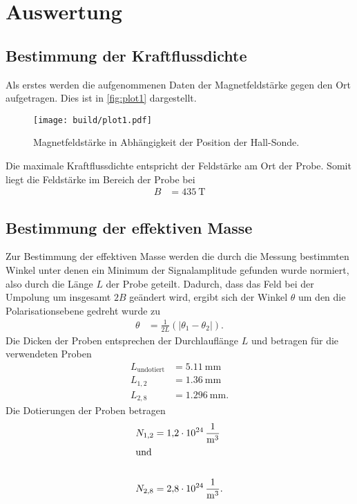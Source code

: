 \section{Auswertung}
\label{sec:Auswertung}


\subsection{Bestimmung der Kraftflussdichte}
\label{sub:Kraftflussdichte}

Als erstes werden die aufgenommenen Daten der Magnetfeldstärke gegen den Ort aufgetragen.
Dies ist in \autoref{fig:plot1} dargestellt.
\begin{figure}[H]
  \centering
  \texttt{[image: build/plot1.pdf]}
  \caption {Magnetfeldstärke in Abhängigkeit der Position der Hall-Sonde.}
  \label{fig:plot1}
\end{figure}


Die maximale Kraftflussdichte entspricht der Feldstärke am Ort der Probe.
Somit liegt die Feldstärke im Bereich der Probe bei 
\begin{align*}
  B &= \qty{435}{\tesla}
\end{align*}

\subsection{Bestimmung der effektiven Masse}
\label{sub:effektiveMasse}

Zur Bestimmung der effektiven Masse werden die durch die Messung bestimmten Winkel unter denen ein Minimum der Signalamplitude gefunden wurde
normiert, also durch die Länge $L$ der Probe geteilt.
Dadurch, dass das Feld bei der Umpolung um insgesamt $\num{2}B$ geändert wird, ergibt sich der Winkel $\theta$ um den die Polarisationsebene
gedreht wurde zu
\begin{align}
  \theta &= \frac{1}{2L}(\lvert \theta_1-\theta_2 \rvert).
\end{align}
Die Dicken der Proben entsprechen der Durchlauflänge $L$ und betragen für die verwendeten Proben
\begin{align*}
  L_{\text{undotiert}}&= \qty{5.11}{\milli\meter}\\
  L_{1,2}&= \qty{1.36}{\milli\meter}\\
  L_{2,8}&= \qty{1.296}{\milli\meter}.
\end{align*}
Die Dotierungen der Proben betragen
\begin{align*}
  N_{1,2}&= \qty{1.2 e24}{\per\cubic\meter}\\
  \shortintertext{und}\\
  N_{2,8}&= \qty{2.8 e24}{\per\cubic\meter}.
\end{align*}


